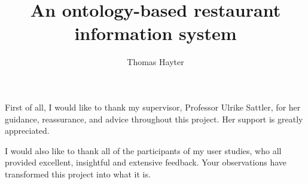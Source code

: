 \documentclass[12pt,BSc,wordcount,twoside]{muthesis}
\begin{document}

\title{An ontology-based restaurant information system}
\author{Thomas Hayter}

\beforeabstract



\afterabstract

First of all, I would like to thank my supervisor, Professor Ulrike Sattler, for her guidance, reassurance, and advice throughout this project. Her support is greatly appreciated.

I would also like to thank all of the participants of my user studies, who all provided excellent, insightful and extensive feedback. Your observations have transformed this project into what it is.

\afterpreface













\appendix





\end{document}
